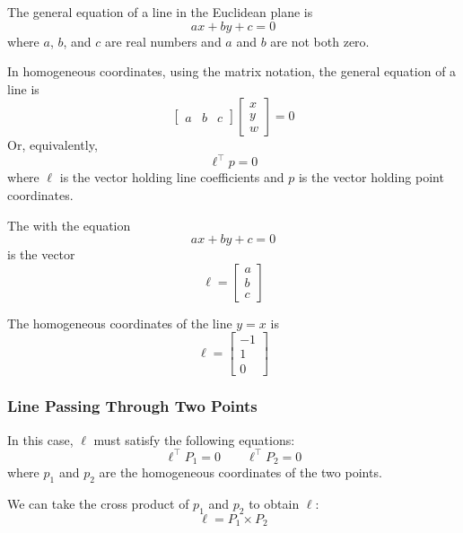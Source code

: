 \begin{remark}
    The general equation of a line in the Euclidean plane is \[
        ax + by + c = 0
    \] where $a$, $b$, and $c$ are real numbers and $a$ and $b$ are not both zero.

    In homogeneous coordinates, using the matrix notation, the general equation of a line is \[
        \begin{bmatrix}
            a & b & c
        \end{bmatrix} \begin{bmatrix}
            x \\ y \\ w
        \end{bmatrix} = 0
    \]
    Or, equivalently, \[
        \ell^\top p = 0
    \] where $\ell$ is the vector holding line coefficients and $p$ is the vector holding point coordinates.
\end{remark}

\begin{definition}
    The  with the equation \[ ax + by + c = 0 \] is the vector \[ \ell = \begin{bmatrix} a \\ b \\ c \end{bmatrix} \]
\end{definition}

\begin{example}
    The homogeneous coordinates of the line $y = x$ is \[
        \ell = \begin{bmatrix}
            -1 \\ 1 \\ 0
        \end{bmatrix}
    \]
\end{example}

\subsubsection{Line Passing Through Two Points}

In this case, $\ell$ must satisfy the following equations: \[
    \ell^\top P_1 = 0 \qquad \ell^\top P_2 = 0
\] where $p_1$ and $p_2$ are the homogeneous coordinates of the two points.

We can take the cross product of $p_1$ and $p_2$ to obtain $\ell$: \[
    \ell = P_1 \times P_2
\]

